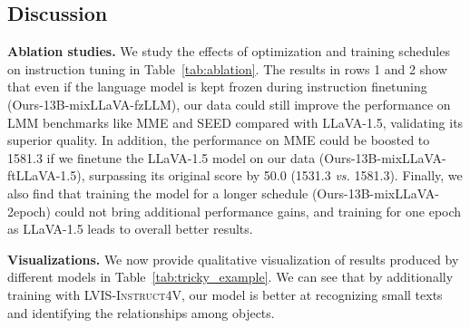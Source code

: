 \documentclass{article}
\makeatletter
\newcommand{\dataname}{\textsc{LVIS-Instruct4V}\xspace}
\newcommand*{\vs}{\emph{vs.}\@\xspace}
\makeatother
\begin{document}
\subsection{Discussion}
\noindent \textbf{Ablation studies.} We study the effects of optimization and training schedules on instruction tuning in Table~\ref{tab:ablation}. The results in rows 1 and 2 show that even if the language model is kept frozen during instruction finetuning (Ours-13B-mixLLaVA-fzLLM), our data could still improve the performance on LMM benchmarks like MME and SEED compared with LLaVA-1.5, validating its superior quality. In addition, the performance on MME could be boosted to 1581.3 if we finetune the LLaVA-1.5 model on our data (Ours-13B-mixLLaVA-ftLLaVA-1.5), surpassing its original score by 50.0 (1531.3 \vs 1581.3). Finally, we also find that training the model for a longer schedule (Ours-13B-mixLLaVA-2epoch) could not bring additional performance gains, and training for one epoch as LLaVA-1.5 leads to overall better results.

\begin{table}[!ht]
\centering
\renewcommand\arraystretch{1.2}
\small
\caption{Ablation studies on both traditional VQA benchmarks and LMM benchmarks.}
\label{tab:ablation}
\end{table}

\vspace{0.05in}
\noindent \textbf{Visualizations.} We now provide qualitative visualization of results produced by different models in Table~\ref{tab:tricky_example}. We can see that by additionally training with \dataname, our model is better at recognizing small texts and identifying the relationships among objects.
\end{document}
